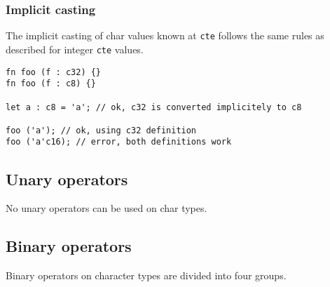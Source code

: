 \subsubsection{Implicit casting}

The implicit casting of char values known at \texttt{cte} follows the same
rules as described for integer \texttt{cte} values.

\begin{lstlisting}[style=coloredverbatim]
fn foo (f : c32) {}
fn foo (f : c8) {}

let a : c8 = 'a'; // ok, c32 is converted implicitely to c8

foo ('a'); // ok, using c32 definition
foo ('a'c16); // error, both definitions work
\end{lstlisting}

\subsection{Unary operators}
\label{sec:org78546fb}

No unary operators can be used on char types.

\subsection{Binary operators}
\label{sec:orge863f7d}

Binary operators on character types are divided into four groups.

